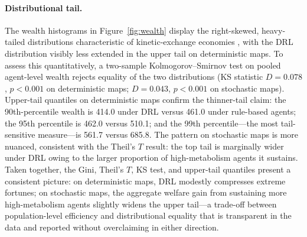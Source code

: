 \documentclass[pdflatex,sn-mathphys-num]{sn-jnl}%
\theoremstyle{thmstyleone}%
\theoremstyle{thmstyletwo}%
\theoremstyle{thmstylethree}%
\begin{document}
\paragraph{Distributional tail.}
The wealth histograms in Figure~\ref{fig:wealth} display the right-skewed, heavy-tailed distributions characteristic of kinetic-exchange economies \citep{Boghosian2014}, with the DRL distribution visibly less extended in the upper tail on deterministic maps.
To assess this quantitatively, a two-sample Kolmogorov--Smirnov test on pooled agent-level wealth rejects equality of the two distributions (KS statistic $D = 0.078$, $p < 0.001$ on deterministic maps; $D = 0.043$, $p < 0.001$ on stochastic maps).
Upper-tail quantiles on deterministic maps confirm the thinner-tail claim: the 90th-percentile wealth is 414.0 under DRL versus 461.0 under rule-based agents; the 95th percentile is 462.0 versus 510.1; and the 99th percentile---the most tail-sensitive measure---is 561.7 versus 685.8.
The pattern on stochastic maps is more nuanced, consistent with the Theil's $T$ result: the top tail is marginally wider under DRL owing to the larger proportion of high-metabolism agents it sustains.
Taken together, the Gini, Theil's $T$, KS test, and upper-tail quantiles present a consistent picture: on deterministic maps, DRL modestly compresses extreme fortunes; on stochastic maps, the aggregate welfare gain from sustaining more high-metabolism agents slightly widens the upper tail---a trade-off between population-level efficiency and distributional equality that is transparent in the data and reported without overclaiming in either direction.
\end{document}
